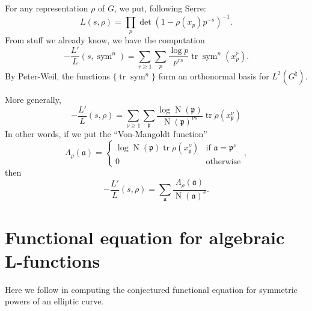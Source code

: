 \documentclass{article}
\DeclareMathOperator{\norm}{N}
\DeclareMathOperator{\sym}{sym}
\DeclareMathOperator{\trace}{tr}
\newcommand{\fa}{\mathfrak{a}}
\newcommand{\fp}{\mathfrak{p}}
\begin{document}
For any representation $\rho$ of $G$, we put, following Serre:
\[
	L(s,\rho) = \prod_p \det(1-\rho(x_p)p^{-s})^{-1} .
\]
From stuff we already know, we have the computation 
\[
	-\frac{L'}{L}(s,\sym^n) = \sum_{r\geqslant 1} \sum_p \frac{\log p}{p^{r s}} \trace \sym^n(x_p^r) .
\]
By Peter-Weil, the functions $\{\trace\sym^n\}$ form an orthonormal basis for 
$L^2(G^\natural)$. 

More generally, 
\[
	-\frac{L'}{L}(s,\rho) 
		= \sum_{\nu\geqslant 1} \sum_\fp \frac{\log \norm(\fp)}{\norm(\fp)^{\nu s}} \trace \rho(x_\fp^\nu)
\]
In other words, if we put the ``Von-Mangoldt function'' 
\[
	\Lambda_\rho(\fa) = 
	\begin{cases}
		\log \norm(\fp) \trace \rho(x_\fp^\nu) & \text{if }\fa=\fp^\nu \\
		0 & \text{otherwise}
	\end{cases} ,
\]
then 
\[
	-\frac{L'}{L}(s,\rho) = \sum_\fa \frac{\Lambda_\rho(\fa)}{\norm(\fa)^s} .
\]





\section{Functional equation for algebraic L-functions}

Here we follow \cite{fontaine-perrin-riou-1994} in computing the conjectured 
functional equation for symmetric powers of an elliptic curve. 
\end{document}
